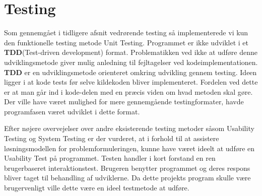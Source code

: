 \section{Testing}
Som gennemgået i tidligere afsnit vedrørende testing så implementerede vi kun den funktionelle testing metode Unit Testing. Programmet er ikke udviklet i et \textbf{TDD}(Test-driven development) format. Problematikken ved ikke at udføre denne udviklingsmetode giver mulig anledning til fejltagelser ved kodeimplementationen. \textbf{TDD} er en udviklingsmetode orienteret omkring udvikling gennem testing. Ideen ligger i at kode tests før selve kildekoden bliver implementeret. Fordelen ved dette er at man går ind i kode-delen med en præcis viden om hvad metoden skal gøre.\cite{unittestbenefits}
Der ville have været mulighed for mere gennemgående testingformater, havde programfasen været udviklet i dette format.

\vspace{5mm}

Efter nøjere overvejelser over andre eksisterende testing metoder såsom Usability Testing og System Testing er der vurderet, at i forhold til at assistere løsningsmodellen for problemformuleringen, kunne have været ideelt at udføre en Usability Test på programmet. Testen handler i kort forstand en ren brugerbaseret interaktionstest. Brugeren benytter programmet og deres respons bliver taget til behandling af udviklerne.\cite{usability} Da dette projekts program skulle være brugervenligt ville dette være en ideel testmetode at udføre.